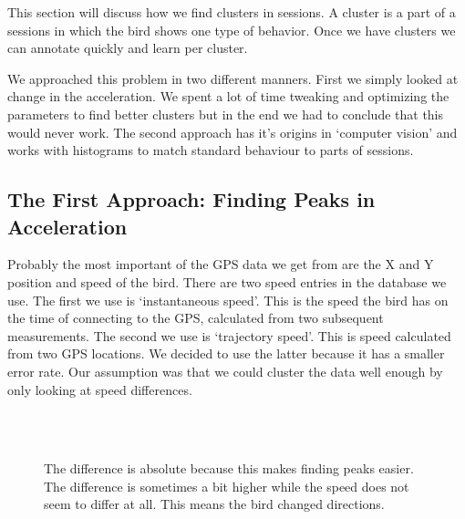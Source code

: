  This section will discuss how we find clusters in sessions. A cluster is a 
part of a sessions in which the bird shows one type of behavior. Once we have
clusters we can annotate quickly and learn per cluster.

We approached this problem in two different manners. First we simply looked at
change in the acceleration. We spent a lot of time tweaking and optimizing the parameters
to find better clusters but in the end we had to conclude that this would never work. 
The second
approach has it's origins in `computer vision' %
and works with histograms to 
match standard behaviour to parts of sessions.

\subsection{The First Approach: Finding Peaks in Acceleration}
 Probably the most important of the GPS data we get from \bits are the X and Y
 position and speed of the bird. There are two speed entries in the database we
 use. The first we use is `instantaneous speed'.    
This is the speed the bird has on the time of
 connecting to the GPS, calculated from two subsequent measurements. The second
we use is 
 `trajectory speed'. This is speed calculated from two GPS locations. 
We decided to use the latter because it has a smaller error rate. 
 Our assumption was that we could cluster the data well 
 enough by only looking at speed differences. 

\begin{figure}
  \centering
   \\
   \\
  \caption{The difference is absolute because this makes finding peaks easier. The difference is sometimes a bit higher while the speed does not seem to differ at all. This means the bird changed directions.}
  \label{fig:speed}
\end{figure}

